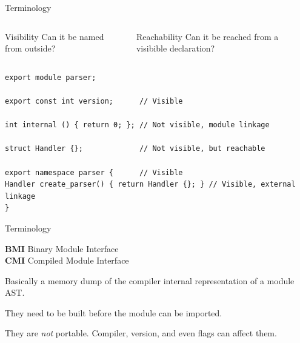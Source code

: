 \documentclass[aspectratio=169]{beamer}
\begin{document}
\begin{frame}[fragile]{Terminology}
  \begin{columns}
    \begin{column}{0.5\textwidth}
      \begin{block}{\footnotesize Visibility}
        \footnotesize Can it be named from outside?
      \end{block}
    \end{column}
    \begin{column}{0.5\textwidth}
      \begin{block}{\footnotesize Reachability}
        \footnotesize Can it be reached from a visibible declaration?
      \end{block}
    \end{column}

  \end{columns}

  \vspace{0.5em}

  \begin{verbatim}
export module parser;

export const int version;      // Visible

int internal () { return 0; }; // Not visible, module linkage

struct Handler {};             // Not visible, but reachable

export namespace parser {      // Visible
Handler create_parser() { return Handler {}; } // Visible, external linkage
}
  \end{verbatim}

  \vspace{0.5em}

  \pause
  \small \cite{Engert21}

\end{frame}

\begin{frame}{Terminology}
  \begin{block}{}
    \textbf{BMI} Binary Module Interface \\
    \textbf{CMI} Compiled Module Interface

    \vspace{1em}

    Basically  a memory dump of the compiler internal representation of a module AST.

    They need to be built before the module can be imported.

    They are \emph{not} portable. Compiler, version, and even flags can affect them.
  \end{block}
\end{frame}
\end{document}
